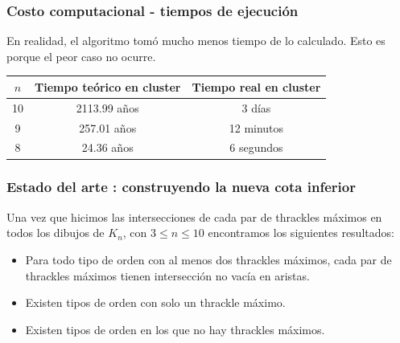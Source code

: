 \begin{frame}
\frametitle{Costo computacional - tiempos de ejecución}
En realidad, el algoritmo tomó mucho menos tiempo de lo calculado. Esto es porque el peor caso no ocurre. 
\begin{table}
	\centering
	\begin{tabular}{|c|c|c|}
		\hline
		$n$      & Tiempo teórico en cluster & Tiempo real en cluster \\ \hline
		10       &     2113.99 años          & 3 días \\   \hline
		9        &     257.01 años           & 12 minutos \\    \hline
		8        &     24.36 años            & 6 segundos \\  \hline
	\end{tabular}
\end{table}
\end{frame}
\begin{frame}
\frametitle{Estado del arte : construyendo la nueva cota inferior}
Una vez que hicimos las intersecciones de cada par de thrackles máximos en todos los dibujos de $K_n$, con $3 \leq n \leq 10$ encontramos los siguientes resultados:
\begin{itemize}
	\item Para todo tipo de orden con al menos dos thrackles máximos, cada par de thrackles máximos tienen intersección no vacía en aristas.
	\item Existen tipos de orden con solo un thrackle máximo.
	\item Existen tipos de orden en los que no hay thrackles máximos.
\end{itemize}
\end{frame}

